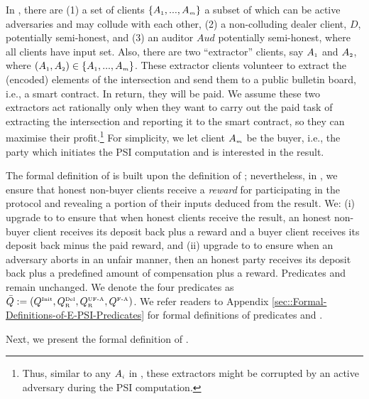 In \ep, there are (1) a set of clients $\{A_{\scriptscriptstyle 1},...,A_{\scriptscriptstyle m}\}$ a subset of which can be active adversaries and may collude with each other, (2) a non-colluding dealer client, $D$, potentially semi-honest, and (3) an auditor $Aud$ potentially semi-honest, where all clients have input set. Also,   there are two ``extractor'' clients, say $A_{\scriptscriptstyle 1}$ and $A_{\scriptscriptstyle 2}$, where $(A_{\scriptscriptstyle 1},A_{\scriptscriptstyle 2})\in \{A_{\scriptscriptstyle 1},...,A_{\scriptscriptstyle m}\}$. These extractor clients volunteer to extract the (encoded) elements of the intersection and send them to a public bulletin board, i.e., a smart contract. In return, they will be paid. 
%
%
We assume these two extractors act rationally only when they want to carry out the paid task of extracting the intersection and reporting it to the smart contract, so they can maximise their profit.\footnote{Thus, similar to any $A_{\scriptscriptstyle i}$ in \p, these extractors might be corrupted by an active adversary during the PSI computation.} For simplicity, we let client $A_{\scriptscriptstyle m}$ be the buyer, i.e., the party which initiates the PSI computation and is interested in the result. 


 The formal definition of \ep is built upon the definition of \p; nevertheless, in \ep, we ensure that honest non-buyer clients receive a \emph{reward} for participating in the protocol and revealing a portion of their inputs deduced from the result. We:  (i)  upgrade \qdel to  \qdelwr to ensure that when honest clients receive the result, an honest non-buyer client receives its deposit back plus a reward and a buyer client receives its deposit back minus the paid reward, and (ii) upgrade  \qUnFAbt to \qUnFAbtwr to ensure when an adversary aborts in an unfair manner, then an honest party receives its deposit back plus a predefined amount of compensation plus a reward.  Predicates  \qinit and \qFAbt remain unchanged. We denote the four predicates as $\bar Q:=(Q^{\scriptscriptstyle \text{Init}},  Q^{\scriptscriptstyle \text{Del}}_{\scriptscriptstyle\text{R}}, Q^{\scriptscriptstyle \text{UF-A}}_{\scriptscriptstyle \text{R}}, Q^{\scriptscriptstyle \text{F-A}})$. We refer readers to Appendix \ref{sec::Formal-Definitions-of-E-PSI-Predicates} for formal definitions of predicates \qdelwr and \qUnFAbtwr. 
 
 
 
 
Next, we present the formal definition of  \ep. 



